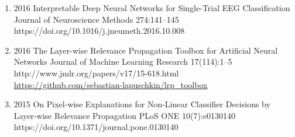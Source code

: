 {\begin{enumerate}
    \item {}
                        {2016}
                        {Interpretable Deep Neural Networks for Single-Trial EEG Classification}
                        {Journal of Neuroscience Methods}
                        {274:141--145}
                        {https://doi.org/10.1016/j.jneumeth.2016.10.008}

    \item {}
                        {2016}
                        {The Layer-wise Relevance Propagation Toolbox for Artificial Neural Networks}
                        {Journal of Machine Learning Research}
                        {17(114):1--5}
                        {http://www.jmlr.org/papers/v17/15-618.html}
                        {\\\href{https://github.com/sebastian-lapuschkin/lrp_toolbox}{https://github.com/sebastian-lapuschkin/lrp\_toolbox}}

    \item {}
                        {2015}
                        {On Pixel-wise Explanations for Non-Linear Classifier Decisions by Layer-wise Relevance Propagation}
                        {PLoS ONE}
                        {10(7):e0130140}
                        {https://doi.org/10.1371/journal.pone.0130140}
\end{enumerate}
}
